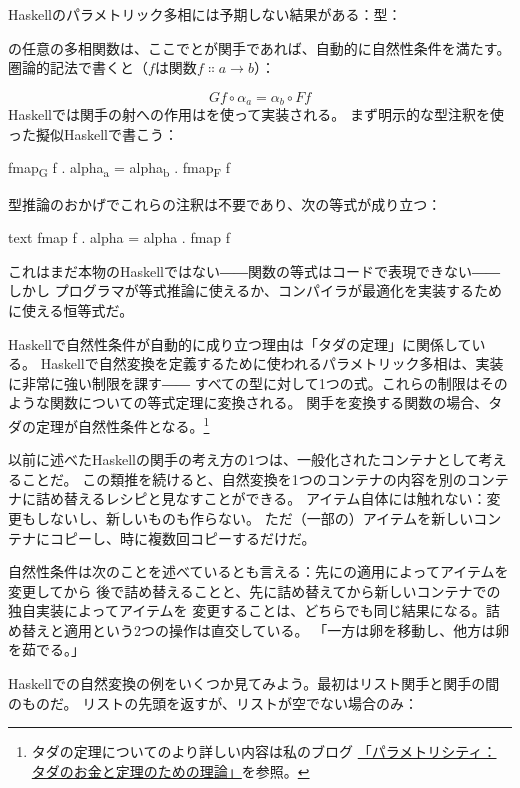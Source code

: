 Haskellのパラメトリック多相には予期しない結果がある：型：

の任意の多相関数は、ここでとが関手であれば、自動的に自然性条件を満たす。
圏論的記法で書くと（$f$は関数$f \Colon a \to b$）：

\[G f \circ \alpha_a = \alpha_b \circ F f\]
Haskellでは関手の射への作用はを使って実装される。
まず明示的な型注釈を使った擬似Haskellで書こう：

\begin{snipv}
fmap\textsubscript{G} f . alpha\textsubscript{a} = alpha\textsubscript{b} . fmap\textsubscript{F} f
\end{snipv}
型推論のおかげでこれらの注釈は不要であり、次の等式が成り立つ：

\begin{snip}{text}
fmap f . alpha = alpha . fmap f
\end{snip}
これはまだ本物のHaskellではない――関数の等式はコードで表現できない――しかし
プログラマが等式推論に使えるか、コンパイラが最適化を実装するために使える恒等式だ。

Haskellで自然性条件が自動的に成り立つ理由は「タダの定理」に関係している。
Haskellで自然変換を定義するために使われるパラメトリック多相は、実装に非常に強い制限を課す――
すべての型に対して1つの式。これらの制限はそのような関数についての等式定理に変換される。
関手を変換する関数の場合、タダの定理が自然性条件となる。\footnote{
  タダの定理についてのより詳しい内容は私のブログ
  \href{https://bartoszmilewski.com/2014/09/22/parametricity-money-for-nothing-and-theorems-for-free/}{「パラメトリシティ：
    タダのお金と定理のための理論」}を参照。}

以前に述べたHaskellの関手の考え方の1つは、一般化されたコンテナとして考えることだ。
この類推を続けると、自然変換を1つのコンテナの内容を別のコンテナに詰め替えるレシピと見なすことができる。
アイテム自体には触れない：変更もしないし、新しいものも作らない。
ただ（一部の）アイテムを新しいコンテナにコピーし、時に複数回コピーするだけだ。

自然性条件は次のことを述べているとも言える：先にの適用によってアイテムを変更してから
後で詰め替えることと、先に詰め替えてから新しいコンテナでの独自実装によってアイテムを
変更することは、どちらでも同じ結果になる。詰め替えと適用という2つの操作は直交している。
「一方は卵を移動し、他方は卵を茹でる。」

Haskellでの自然変換の例をいくつか見てみよう。最初はリスト関手と関手の間のものだ。
リストの先頭を返すが、リストが空でない場合のみ：

